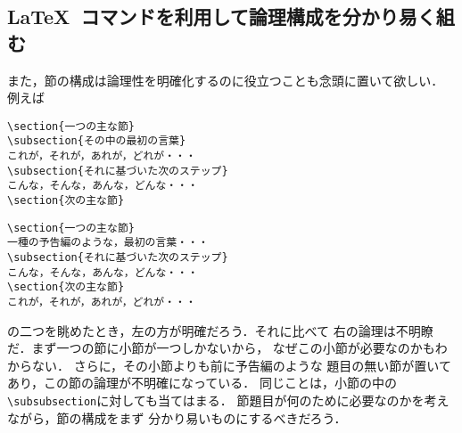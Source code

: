 \documentclass[onecolumn]{jsce}  %
\begin{document}
\subsection{\LaTeX\ コマンドを利用して論理構成を分かり易く組む}

また，節の構成は論理性を明確化するのに役立つことも念頭に置いて欲しい．
例えば
\medskip

\noindent
\mbox{}\hfill
\begin{minipage}[t]{.42\textwidth}
\begin{verbatim}
\section{一つの主な節}
\subsection{その中の最初の言葉}
これが，それが，あれが，どれが・・・
\subsection{それに基づいた次のステップ}
こんな，そんな，あんな，どんな・・・
\section{次の主な節}
\end{verbatim}
\end{minipage}
\hfill
\begin{minipage}[t]{.42\textwidth}
\begin{verbatim}
\section{一つの主な節}
一種の予告編のような，最初の言葉・・・
\subsection{それに基づいた次のステップ}
こんな，そんな，あんな，どんな・・・
\section{次の主な節}
これが，それが，あれが，どれが・・・
\end{verbatim}
\end{minipage}
\hfill\mbox{}
\medskip

\noindent
の二つを眺めたとき，左の方が明確だろう．それに比べて
右の論理は不明瞭だ．まず一つの節に小節が一つしかないから，
なぜこの小節が必要なのかもわからない．
さらに，その小節よりも前に予告編のような
題目の無い節が置いてあり，この節の論理が不明確になっている．
同じことは，小節の中の \verb+\subsubsection+に対しても当てはまる．
節題目が何のために必要なのかを考えながら，節の構成をまず
分かり易いものにするべきだろう．
\end{document}
